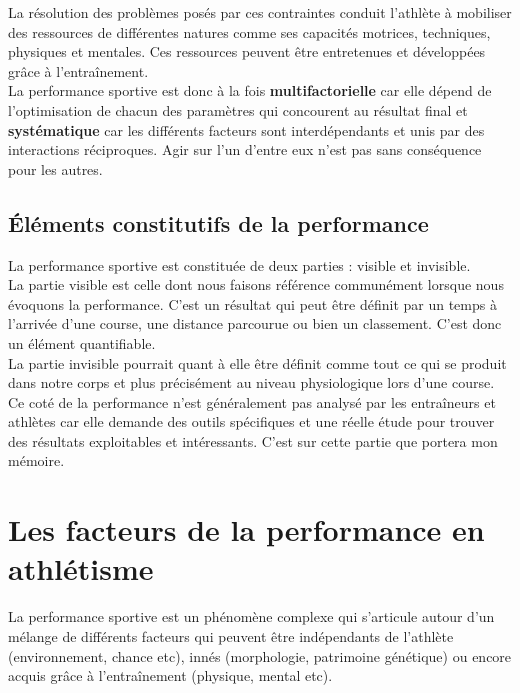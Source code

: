             La résolution des problèmes posés par ces contraintes conduit l'athlète à mobiliser des ressources de différentes natures comme ses capacités motrices, techniques, physiques et mentales. Ces ressources peuvent être entretenues et développées grâce à l’entraînement.\\
            
            La performance sportive est donc à la fois \textbf{multifactorielle} car elle dépend de l'optimisation de chacun des paramètres qui concourent au résultat final et \textbf{systématique} car les différents facteurs sont interdépendants et unis par des interactions réciproques. Agir sur l'un d'entre eux n'est pas sans conséquence pour les autres.
            
        
        \subsection{Éléments constitutifs de la performance}
        
            La performance sportive est constituée de deux parties : visible et invisible.\\
            
            La partie visible est celle dont nous faisons référence communément lorsque nous évoquons la performance. C'est un résultat qui peut être définit par un temps à l'arrivée d'une course, une distance parcourue ou bien un classement. C'est donc un élément quantifiable.\\
            
            La partie invisible pourrait quant à elle être définit comme tout ce qui se produit dans notre corps et plus précisément au niveau physiologique lors d'une course. Ce coté de la performance n'est généralement pas analysé par les entraîneurs et athlètes car elle demande des outils spécifiques et une réelle étude pour trouver des résultats exploitables et intéressants. C'est sur cette partie que portera mon mémoire. 
    
        \vspace{10pt}
    
    \section {Les facteurs de la performance en athlétisme}
    
        La performance sportive est un phénomène complexe qui s’articule autour d'un mélange de différents facteurs qui peuvent être indépendants de l'athlète (environnement, chance etc), innés (morphologie, patrimoine génétique) ou encore acquis grâce à l'entraînement (physique, mental etc).\\
        
